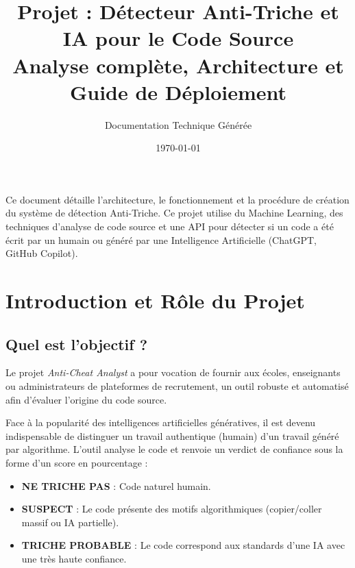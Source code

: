 \documentclass[a4paper,11pt]{article}
\title{\textbf{\Huge Projet : Détecteur Anti-Triche et IA pour le Code Source}\vspace{0.5cm} \\ \Large Analyse complète, Architecture et Guide de Déploiement}
\author{Documentation Technique Générée}
\date{\today}
\begin{document}
\maketitle
\thispagestyle{empty}
\vspace{2cm}

\begin{center}
    \begin{tcolorbox}[colback=primary!5!white,colframe=primary,title=Résumé du Projet]
        Ce document détaille l'architecture, le fonctionnement et la procédure de création du système de détection Anti-Triche. Ce projet utilise du Machine Learning, des techniques d'analyse de code source et une API pour détecter si un code a été écrit par un humain ou généré par une Intelligence Artificielle (ChatGPT, GitHub Copilot).
    \end{tcolorbox}
\end{center}

\newpage
\tableofcontents
\newpage

\section{Introduction et Rôle du Projet}
\subsection{Quel est l'objectif ?}
Le projet \textit{Anti-Cheat Analyst} a pour vocation de fournir aux écoles, enseignants ou administrateurs de plateformes de recrutement, un outil robuste et automatisé afin d'évaluer l'origine du code source.

Face à la popularité des intelligences artificielles génératives, il est devenu indispensable de distinguer un travail authentique (humain) d'un travail généré par algorithme. L'outil analyse le code et renvoie un verdict de confiance sous la forme d'un score en pourcentage :
\begin{itemize}
    \item \textbf{NE TRICHE PAS} : Code naturel humain.
    \item \textbf{SUSPECT} : Le code présente des motifs algorithmiques (copier/coller massif ou IA partielle).
    \item \textbf{TRICHE PROBABLE} : Le code correspond aux standards d'une IA avec une très haute confiance.
\end{itemize}
\end{document}
